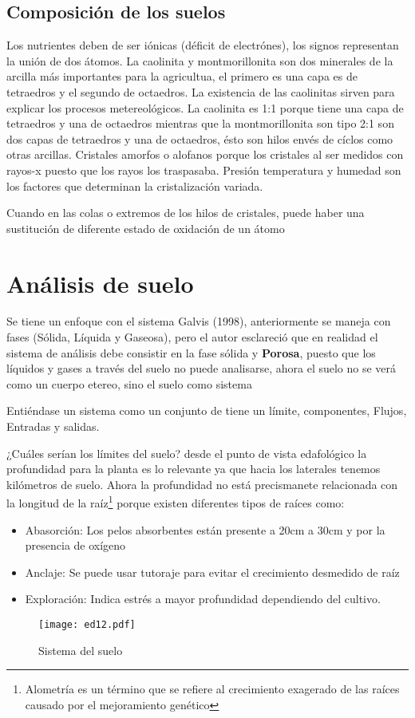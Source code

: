 \subsection{Composición de los suelos}
Los nutrientes deben de ser iónicas (déficit de electrónes), los signos representan la unión de dos átomos.
La caolinita y montmorillonita son dos minerales de la arcilla más importantes para la agricultua, el primero es una capa es de tetraedros y el segundo de octaedros.
La existencia de las caolinitas sirven para explicar los procesos metereológicos. La caolinita es 1:1 porque tiene una capa de tetraedros y una de octaedros mientras que la montmorillonita son tipo 2:1 son dos capas de tetraedros y una de octaedros, ésto son hilos envés de cíclos como otras arcillas.
Cristales amorfos o alofanos porque los cristales al ser medidos con rayos-x puesto que los rayos los traspasaba.
Presión temperatura y humedad son los factores que determinan la cristalización variada.
\begin{definition}
    Cuando en las colas o extremos de los hilos de cristales, puede haber una sustitución de diferente estado de oxidación de un átomo
\end{definition}
\section{Análisis de suelo}

Se tiene un enfoque con el sistema Galvis (1998), anteriormente se maneja con fases (Sólida, Líquida y Gaseosa), pero
el autor esclareció que en realidad el sistema de análisis debe consistir en la fase sólida y \textbf{Porosa},
puesto que los líquidos y gases a través del suelo no puede analisarse, ahora el suelo no se verá como un cuerpo etereo, sino el suelo como sistema

Entiéndase un sistema como un conjunto de tiene un límite, componentes, Flujos, Entradas y salidas.

¿Cuáles serían los límites del suelo? desde el punto de vista edafológico la profundidad para la planta es lo relevante ya que hacia los laterales tenemos kilómetros de suelo.
Ahora la profundidad no está precismanete relacionada con la longitud de la raíz\footnote{Alometría es un término que se refiere al crecimiento exagerado de las raíces causado por el mejoramiento genético} porque existen diferentes tipos de raíces como:
\begin{itemize}
    \item Abasorción: Los pelos absorbentes están presente a 20cm a 30cm y por la presencia de oxígeno
    \item Anclaje: Se puede usar tutoraje para evitar el crecimiento desmedido de raíz
    \item Exploración: Indica estrés a mayor profundidad dependiendo del cultivo.
\end{itemize}
\begin{figure}[h!]
\centering
\begin{turn}{90}
  \texttt{[image: ed12.pdf]}
    \end{turn}
  \caption{Sistema del suelo}
  \label{ed12}
\end{figure}

